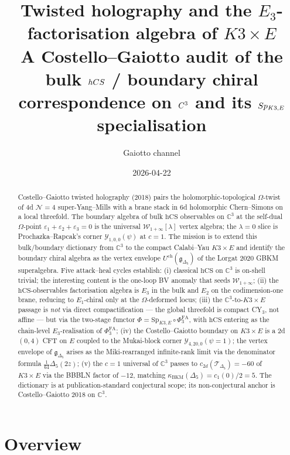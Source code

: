 \documentclass[11pt]{article}
\title{Twisted holography and the $E_3$-factorisation algebra of
$K3\times E$\\
{\large A Costello--Gaiotto audit of the bulk $\hCS$ / boundary chiral
correspondence on $\C^3$ and its $\Sp_{K3,E}$ specialisation}}
\author{Gaiotto channel}
\date{2026-04-22}
\providecommand{\Eone}{E_1}
\providecommand{\Etwo}{E_2}
\providecommand{\Ethree}{E_3}
\providecommand{\C}{\mathbb{C}}
\providecommand{\cN}{\mathcal{N}}
\providecommand{\cT}{\mathcal{T}}
\providecommand{\cW}{\mathcal{W}}
\providecommand{\cY}{\mathcal{Y}}
\providecommand{\fg}{\mathfrak{g}}
\providecommand{\hCS}{\mathrm{hCS}}
\providecommand{\Sp}{\mathrm{Sp}}
\providecommand{\BKM}{\mathrm{BKM}}
\begin{document}
\maketitle

\begin{abstract}
Costello--Gaiotto twisted holography (2018) pairs the holomorphic-topological
$\Omega$-twist of 4d $\cN{=}4$ super-Yang--Mills with a brane stack in 6d
holomorphic Chern--Simons on a local threefold. The boundary algebra of
bulk $\hCS$ observables on $\C^3$ at the self-dual $\Omega$-point
$\varepsilon_1 + \varepsilon_2 + \varepsilon_3 = 0$ is the universal
$\cW_{1+\infty}[\lambda]$ vertex algebra; the $\lambda = 0$ slice is
Prochazka--Rapcak's corner $\cY_{1,0,0}(\psi)$ at $c = 1$. The mission is
to extend this bulk/boundary dictionary from $\C^3$ to the compact
Calabi--Yau $K3 \times E$ and identify the boundary chiral algebra as the
vertex envelope $U^{\mathrm{ch}}(\fg_{\Delta_5})$ of the Lorgat 2020 GBKM
superalgebra. Five attack--heal cycles establish: (i) classical $\hCS$ on
$\C^3$ is on-shell trivial; the interesting content is the one-loop BV
anomaly that seeds $\cW_{1+\infty}$; (ii) the $\hCS$-observables
factorisation algebra is $\Ethree$ in the bulk and $\Etwo$ on the
codimension-one brane, reducing to $\Eone$-chiral only at the $\Omega$-deformed
locus; (iii) the $\C^3$-to-$K3\times E$ passage is \emph{not} via direct
compactification --- the global threefold is compact CY$_3$, not affine ---
but via the two-stage functor $\Phi = \Sp_{K3,E}\circ\Phi^{\mathrm{FA}}_3$,
with $\hCS$ entering as the chain-level $\Ethree$-realisation of
$\Phi^{\mathrm{FA}}_3$; (iv) the Costello--Gaiotto boundary on $K3\times E$
is a 2d $(0,4)$ CFT on $E$ coupled to the Mukai-block corner
$\cY_{4,20,0}(\psi=1)$; the vertex envelope of $\fg_{\Delta_5}$ arises as
the Miki-rearranged infinite-rank limit via the denominator formula
$\tfrac{1}{64}\Delta_5(2z)$; (v) the $c = 1$ universal of $\C^3$ passes
to $c_{2d}(\cT_{\Delta_5}) = -60$ of $K3\times E$ via the BBBLN factor of
$-12$, matching $\kappa_{\BKM}(\Delta_5) = c_1(0)/2 = 5$. The dictionary
is at publication-standard conjectural scope; its non-conjectural anchor
is Costello--Gaiotto 2018 on $\C^3$.
\end{abstract}

\section*{Overview}
\end{document}
